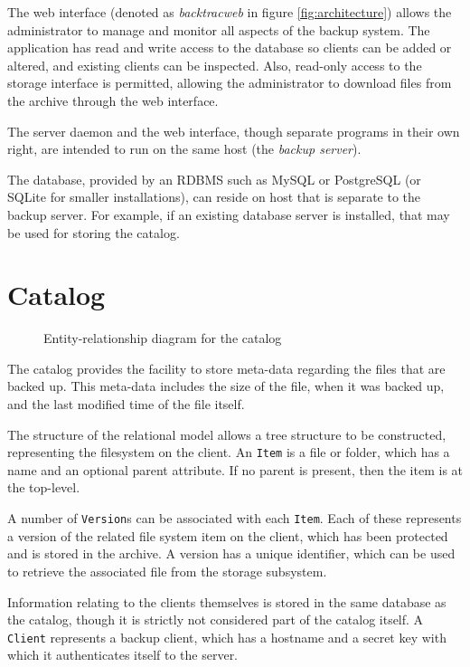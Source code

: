 The web interface (denoted as \emph{backtracweb} in figure
\ref{fig:architecture}) allows the administrator to manage and monitor all
aspects of the backup system. The application has read and write access to the
database so clients can be added or altered, and existing clients can be
inspected. Also, read-only access to the storage interface is permitted,
allowing the administrator to download files from the archive through the web
interface.

The server daemon and the web interface, though separate programs in their own
right, are intended to run on the same host (the \emph{backup server}).

The database, provided by an RDBMS such as MySQL or PostgreSQL (or SQLite for
smaller installations), can reside on host that is separate to the backup
server. For example, if an existing database server is installed, that may be
used for storing the catalog.

\section{Catalog}

\begin{figure}
    \begin{center}
        \newlength{\svgwidth}
        \setlength{\svgwidth}{1.1\textwidth}
        \tiny
        
    \end{center}
    \caption{Entity-relationship diagram for the catalog}
    \label{fig:erd}
\end{figure}

The catalog provides the facility to store meta-data regarding the files that
are backed up. This meta-data includes the size of the file, when it was backed
up, and the last modified time of the file itself.

The structure of the relational model allows a tree structure to be
constructed, representing the filesystem on the client. An \verb!Item! is
a file or folder, which has a name and an optional parent attribute. If no
parent is present, then the item is at the top-level.

A number of \verb!Version!s can be associated with each \verb!Item!. Each of
these represents a version of the related file system item on the client, which
has been protected and is stored in the archive. A version has a unique
identifier, which can be used to retrieve the associated file from the storage
subsystem.

Information relating to the clients themselves is stored in the same database
as the catalog, though it is strictly not considered part of the catalog
itself. A \verb!Client! represents a backup client, which has a hostname and
a secret key with which it authenticates itself to the server.

